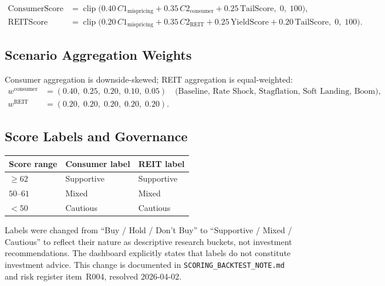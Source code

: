\documentclass[11pt,a4paper]{article}
\theoremstyle{plain}
\theoremstyle{definition}
\newcommand{\clip}{\operatorname{clip}}
\begin{document}
\begin{align}
\text{ConsumerScore}
&= \clip\!\bigl(
    0.40\,C1_{\mathrm{mispricing}}
  + 0.35\,C2_{\mathrm{consumer}}
  + 0.25\,\text{TailScore},\;
  0,\;100
  \bigr), \\
\text{REITScore}
&= \clip\!\bigl(
    0.20\,C1_{\mathrm{mispricing}}
  + 0.35\,C2_{\mathrm{REIT}}
  + 0.25\,\text{YieldScore}
  + 0.20\,\text{TailScore},\;
  0,\;100
  \bigr).
\end{align}

\subsection{Scenario Aggregation Weights}

Consumer aggregation is downside-skewed; REIT aggregation is
equal-weighted:
\begin{align*}
  w^{\mathrm{consumer}}
  &= (0.40,\;0.25,\;0.20,\;0.10,\;0.05)
  \quad\text{(Baseline, Rate Shock, Stagflation, Soft Landing, Boom)}, \\
  w^{\mathrm{REIT}}
  &= (0.20,\;0.20,\;0.20,\;0.20,\;0.20).
\end{align*}

\subsection{Score Labels and Governance}

\begin{center}
\begin{tabular}{lll}
\toprule
Score range & Consumer label & REIT label \\
\midrule
$\geq 62$ & Supportive & Supportive \\
$50$--$61$ & Mixed      & Mixed      \\
$< 50$    & Cautious   & Cautious   \\
\bottomrule
\end{tabular}
\end{center}

\begin{govbox}
Labels were changed from ``Buy / Hold / Don't Buy'' to ``Supportive /
Mixed / Cautious'' to reflect their nature as descriptive research
buckets, not investment recommendations.  The dashboard explicitly states
that labels do not constitute investment advice.  This change is documented
in \texttt{SCORING\_BACKTEST\_NOTE.md} and risk register item~R004,
resolved 2026-04-02.
\end{govbox}
\end{document}
